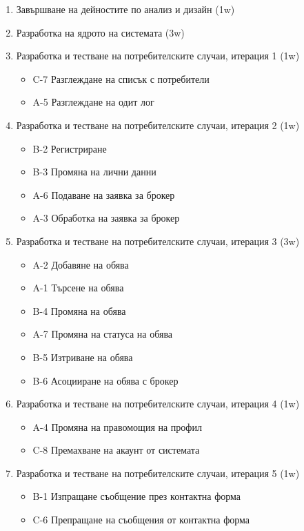 \documentclass[a4paper]{article}
\begin{document}
\begin{enumerate}
\item Завършване на дейностите по анализ и дизайн (1w)
\item Разработка на ядрото на системата (3w)
\item {Разработка и тестване на потребителските случаи, итерация 1 (1w)
	\begin{itemize}
		\item C-7	Разглеждане на списък с потребители
		\item A-5	Разглеждане на одит лог
	\end{itemize}
}
\item {Разработка и тестване на потребителските случаи, итерация 2 (1w)
	\begin{itemize}
		\item B-2	Регистриране
		\item B-3	Промяна на лични данни
		\item A-6	Подаване на заявка за брокер
		\item A-3	Обработка на заявка за брокер
	\end{itemize}
}
\item {Разработка и тестване на потребителските случаи, итерация 3 (3w)
	\begin{itemize}
		\item A-2	Добавяне на обява
		\item A-1	Търсене на обява
		\item B-4	Промяна на обява
		\item A-7	Промяна на статуса на обява
		\item B-5	Изтриване на обява
		\item B-6	Асоцииране на обява с брокер
	\end{itemize}		
}
\item {Разработка и тестване на потребителските случаи, итерация 4 (1w)
	\begin{itemize}
		\item A-4	Промяна на правомощия на профил
		\item C-8	Премахване на акаунт от системата
	\end{itemize}		
}		
\item {Разработка и тестване на потребителските случаи, итерация 5 (1w)
	\begin{itemize}
		\item B-1	Изпращане съобщение през контактна форма
		\item C-6	Препращане на съобщения от контактна форма
	\end{itemize}		
}
\end{enumerate}
\end{document}
